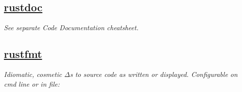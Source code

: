 \subsection*{\href{https://doc.rust-lang.org/rustdoc/what-is-rustdoc.html}{rustdoc}}
\textit{See separate Code Documentation cheatsheet.}
\ \\
\subsection*{\href{https://github.com/rust-lang/rustfmt}{rustfmt}}
\textit{Idiomatic, cosmetic $\Delta$s to source code as written or displayed. Configurable on cmd line or in  file:}\\
\\
\\
\ \\
